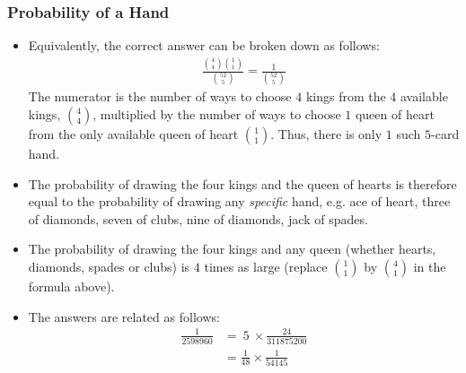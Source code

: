 \begin{frame}
\frametitle{Probability of a Hand}
\begin{itemize}
\item Equivalently, the correct answer can be broken down as follows: 
\begin{align*}
\frac{\binom{4}{4} \binom{1}{1}}{\binom{52}{5}}  = \frac{1}{\binom{52}{5}} 
\end{align*}
The numerator is the number of ways to choose $4$ kings from the $4$ available kings, $\binom{4}{4}$, multiplied by the number of ways to choose $1$ queen of heart from the only available queen of heart $\binom{1}{1}$. Thus, there is only $1$ such $5$-card hand.
\item The probability of drawing the four kings and the queen of hearts is therefore equal to the probability of drawing any \textit{specific} hand, e.g. ace of heart, three of diamonds, seven of clubs, nine of diamonds, jack of spades. 
\item The probability of drawing the four kings and any queen (whether hearts, diamonds, spades or clubs) is $4$ times as large (replace $\binom{1}{1}$ by $\binom{4}{1}$ in the formula above). 
\item The answers are related as follows:
\begin{align*}
\tfrac{1}{2598960}
& = ~ 5 ~ \times \tfrac{24}{311875200} \\
& = \tfrac{1}{48}\times \tfrac{1}{54145} 
\end{align*}
\end{itemize}
\end{frame}




